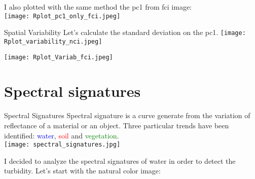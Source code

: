 \documentclass{beamer}
\begin{document}
\begin{frame}%
\small{I also plotted with the same method the pc1 from fci image: }\\
\bigskip
\centering
    \texttt{[image: Rplot\_pc1\_only\_fci.jpeg]}\\
\end{frame}

\begin{frame}{Spatial Variability}
\scriptsize{Let's calculate the standard deviation on the pc1. }
\texttt{\tiny{}}
\centering
    \texttt{[image: Rplot\_variability\_nci.jpeg]}
\end{frame}

\begin{frame}
\texttt{\tiny{}}
\centering
    \texttt{[image: Rplot\_Variab\_fci.jpeg]}
\end{frame}

\section{Spectral signatures}
\begin{frame}{Spectral Signatures}
\small{Spectral signature is a curve generate from  the variation of reflectance of a material or an object. Three particular trends have been identified: \textcolor{blue}{water}}, \textcolor{red}{soil} and \textcolor{green}{vegetation}.\\
\bigskip
\centering
\texttt{[image: spectral\_signatures.jpg]}
\end{frame}

\begin{frame}
\small{I decided to analyze the spectral signatures of water in order to detect the turbidity. Let's start with the natural color image: }
\texttt{\tiny{}}
\centering
\end{frame}

\begin{frame}
\texttt{\tiny{}}
\end{frame}
\end{document}
